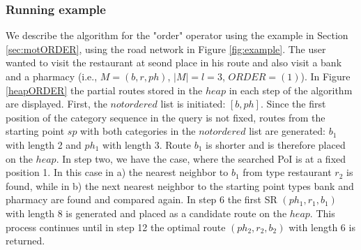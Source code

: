 \subsubsection{Running example}
We describe the algorithm for the "order" operator using the example in Section \ref{sec:motORDER}, using the road network in Figure \ref{fig:example}. The user wanted to visit the restaurant at seond place in his route and also visit a bank and a pharmacy (i.e., $M = (b, r, ph)$, $|M| = l = 3$, $ORDER = (1)$). In Figure \ref{heapORDER} the partial routes stored in the $heap$ in each step of the algorithm are displayed.
First, the $notordered$ list is initiated: $[b, ph]$. Since the first position of the category sequence in the query is not fixed, routes from the starting point $sp$ with both categories in the $notordered$ list are generated: $b_1$ with length 2 and $ph_1$ with length 3. Route $b_1$ is shorter and is therefore placed on the $heap$. In step two, we have the case, where the searched PoI is at a fixed position 1. In this case in a) the nearest neighbor to $b_1$ from type restaurant $r_2$ is found, while in b) the next nearest neighbor to the starting point types bank and pharmacy are found and compared again. In step 6 the first SR $(ph_1, r_1, b_1)$ with length 8 is generated and placed as a candidate route on the $heap$.
This process continues until in step 12 the optimal route $(ph_2, r_2, b_2)$ with length 6 is returned.

